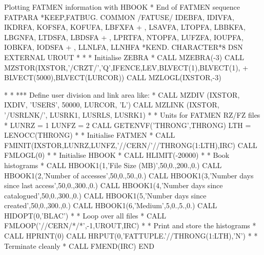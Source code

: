 \begin{XMPt}{Plotting FATMEN information with HBOOK}
* End of FATMEN sequence FATPARA                                        
*KEEP,FATBUG.
      COMMON /FATUSE/ IDEBFA, IDIVFA, IKDRFA, KOFSFA, KOFUFA, LBFXFA
     +              , LSAVFA, LTOPFA, LBBKFA, LBGNFA, LTDSFA, LBDSFA
     +              , LPRTFA, NTOPFA, LUFZFA, IOUPFA, IOBKFA, IODSFA
     +              , LLNLFA, LLNHFA
*KEND.
      CHARACTER*8   DSN                                                 
      EXTERNAL      UROUT
*                                                                       
*                                                                       
*     Initialise ZEBRA                                                  
*                                                                       
      CALL MZEBRA(-3)                                                   
      CALL MZSTOR(IXSTOR,'/CRZT/','Q',IFENCE,LEV,BLVECT(1),BLVECT(1),   
     +            BLVECT(5000),BLVECT(LURCOR))                          
      CALL MZLOGL(IXSTOR,-3)                                            
                                                                        
*                                                                       
* *** Define user division and link area like:                          
*                                                                       
      CALL MZDIV  (IXSTOR, IXDIV, 'USERS', 50000, LURCOR, 'L')          
      CALL MZLINK (IXSTOR, '/USRLNK/', LUSRK1, LUSRLS, LUSRK1)          
*                                                                       
*     Units for FATMEN RZ/FZ files                                      
*                                                                       
      LUNRZ = 1                                                         
      LUNFZ = 2                                                         
      CALL GETENVF('THRONG',THRONG)
      LTH = LENOCC(THRONG)
*                                                                       
*     Initialise FATMEN                                                 
*                                                                       
      CALL FMINIT(IXSTOR,LUNRZ,LUNFZ,'//CERN/'//THRONG(1:LTH),IRC)
      CALL FMLOGL(0)
*
*     Initialise HBOOK
*
      CALL HLIMIT(-20000)
*
*     Book histograms
*
      CALL HBOOK1(1,'File Size (MB)',50,0.,200.,0.)
      CALL HBOOK1(2,'Number of accesses',50,0.,50.,0.)
      CALL HBOOK1(3,'Number days since last access',50,0.,300.,0.)
      CALL HBOOK1(4,'Number days since catalogued',50,0.,300.,0.)
      CALL HBOOK1(5,'Number days since created',50,0.,300.,0.)
      CALL HBOOK1(6,'Medium',5,0.,5.,0.)
      CALL HIDOPT(0,'BLAC')
*
*     Loop over all files
*
      CALL FMLOOP('//CERN/*/*',-1,UROUT,IRC)
*
*     Print and store the histograms
*
      CALL HPRINT(0)
      CALL HRPUT(0,'FATTUPLE.'//THRONG(1:LTH),'N')
*
*     Terminate cleanly
*
      CALL FMEND(IRC)
      END


\end{XMPt}
